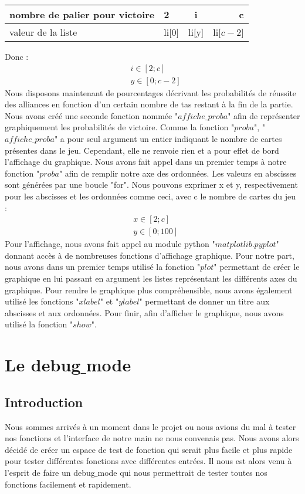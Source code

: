 \documentclass[10pt,a4paper,french,titlepage]{article}
\theoremstyle{definition}
\begin{document}
\begin{center}
\begin{tabular}{|p{3cm}|l|c|r|}
  \hline
  nombre de palier pour victoire & 2 & i & c\\
  \hline
  valeur de la liste & li[0] & li[y] & li[$c-2$] \\
  \hline
\end{tabular}
\end{center}
Donc :
\begin{align*}
&i \in [2;c]\\
&y \in [0;c-2]
\end{align*}
Nous disposons maintenant de pourcentages décrivant les probabilités de réussite des alliances en fonction d'un certain nombre de tas restant à la fin 
de la partie. Nous avons créé une seconde fonction nommée "$affiche\_proba$" afin de représenter graphiquement les probabilités de victoire. Comme la fonction "$proba$",
"$affiche\_proba$" a pour seul argument un entier indiquant le nombre de cartes présentes dans le jeu. Cependant, elle ne renvoie rien et a pour effet de bord l'affichage
du graphique. Nous avons fait appel dans un premier temps à notre fonction "$proba$" afin de remplir notre axe des ordonnées. Les valeurs en abscisses sont générées par une boucle
"for". Nous pouvons exprimer x et y, respectivement pour les abscisses et les ordonnées comme ceci, avec c le nombre de cartes du jeu :
\begin{align*}
&x \in [2;c] \\
&y \in [0;100]
\end{align*}
Pour l'affichage, nous avons fait appel au module python "$matplotlib.pyplot$" donnant accès à de nombreuses fonctions d'affichage graphique. Pour notre part, nous avons
dans un premier temps utilisé la fonction "$plot$" permettant de créer le graphique en lui passant en argument les listes représentant les différents axes du graphique.
Pour rendre le graphique plus compréhensible, nous avons également utilisé les fonctions "$xlabel$" et "$ylabel$" permettant de donner un titre aux abscisses et aux
ordonnées. Pour finir, afin d'afficher le graphique, nous avons utilisé la fonction "$show$".



\section{Le debug$\_$mode}
\subsection{Introduction}
Nous sommes arrivés à un moment dans le projet ou nous avions du mal à tester nos fonctions et l’interface de notre main ne nous convenais pas. Nous avons alors décidé de créer un espace de test de fonction qui serait plus facile et plus rapide pour tester différentes fonctions avec différentes entrées. Il nous est alors venu à l’esprit de faire un debug$\_$mode qui nous permettrait de tester toutes nos fonctions facilement et rapidement.
\end{document}
